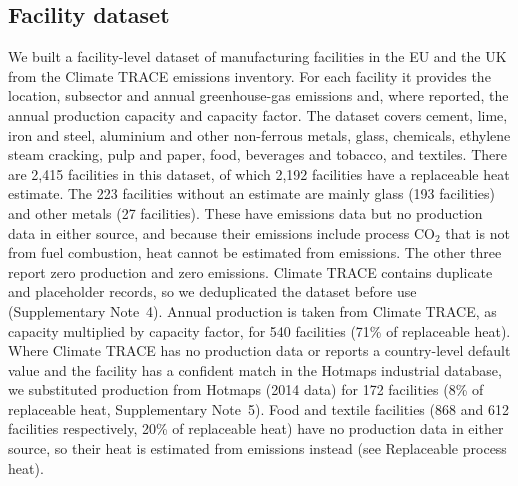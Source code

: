 \documentclass[11pt]{article}
\begin{document}
\subsection*{Facility dataset}
We built a facility-level dataset of manufacturing facilities in the EU and the UK from the Climate TRACE emissions inventory\cite{climatetrace2026}. For each facility it provides the location, subsector and annual greenhouse-gas emissions and, where reported, the annual production capacity and capacity factor. The dataset covers cement, lime, iron and steel, aluminium and other non-ferrous metals, glass, chemicals, ethylene steam cracking, pulp and paper, food, beverages and tobacco, and textiles. There are 2,415 facilities in this dataset, of which 2,192 facilities have a replaceable heat estimate. The 223 facilities without an estimate are mainly glass (193 facilities) and other metals (27 facilities). These have emissions data but no production data in either source, and because their emissions include process CO$_2$ that is not from fuel combustion, heat cannot be estimated from emissions. The other three report zero production and zero emissions. Climate TRACE contains duplicate and placeholder records, so we deduplicated the dataset before use (Supplementary Note~4). Annual production is taken from Climate TRACE, as capacity multiplied by capacity factor, for 540 facilities (71\% of replaceable heat). Where Climate TRACE has no production data or reports a country-level default value and the facility has a confident match in the Hotmaps industrial database, we substituted production from Hotmaps\cite{hotmaps2018} (2014 data) for 172 facilities (8\% of replaceable heat, Supplementary Note~5). Food and textile facilities (868 and 612 facilities respectively, 20\% of replaceable heat) have no production data in either source, so their heat is estimated from emissions instead (see Replaceable process heat).
\end{document}
